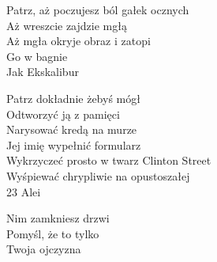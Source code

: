\begin{text}
    Patrz, aż poczujesz ból gałek ocznych\\
    Aż wreszcie zajdzie mgłą\\
    Aż mgła okryje obraz i zatopi\\
    Go w bagnie\\
    Jak Ekskalibur

    Patrz dokładnie żebyś mógł\\
    Odtworzyć ją z pamięci\\
    Narysować kredą na murze\\
    Jej imię wypełnić formularz\\
    Wykrzyczeć prosto w twarz Clinton Street\\
    Wyśpiewać chrypliwie na opustoszałej\\
    23 Alei

    Nim zamkniesz drzwi\\
    Pomyśl, że to tylko\\
    Twoja ojczyzna
\end{text}
\begin{chord}

\end{chord}